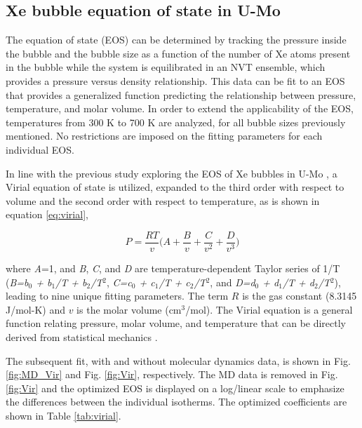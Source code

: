 \documentclass[review]{elsarticle}
\begin{document}
\subsection{Xe bubble equation of state in U-Mo}

The equation of state (EOS) can be determined by tracking the pressure inside the bubble and the bubble size as a function of the number of Xe atoms present in the bubble while the system is equilibrated in an NVT ensemble, which provides a pressure versus density relationship. This data can be fit to an EOS that provides a generalized function predicting the relationship between pressure, temperature, and molar volume. In order to extend the applicability of the EOS, temperatures from 300 K to 700 K are analyzed, for all bubble sizes previously mentioned. No restrictions are imposed on the fitting parameters for each individual EOS. 

In line with the previous study exploring the EOS of Xe bubbles in U-Mo \cite{Beeler2020}, a Virial equation of state is utilized, expanded to the third order with respect to volume and the second order with respect to temperature, as is shown in equation \ref{eq:virial}, 

\begin{equation}
\label{eq:virial}
P=\frac{RT}{v}\bigg( A + \frac{B}{v} + \frac{C}{v^2} + \frac{D}{v^3} \bigg)
\end{equation}

\noindent where \textit{A}=1, and \textit{B}, \textit{C}, and \textit{D} are temperature-dependent Taylor series of 1/T (\textit{B=b$_0$ + b$_1$/T + b$_2$/T$^2$}, \textit{C=c$_0$ + c$_1$/T + c$_2$/T$^2$}, and \textit{D=d$_0$ + d$_1$/T + d$_2$/T$^2$}), leading to nine unique fitting parameters. The term $R$ is the gas constant (8.3145 J/mol-K) and $v$ is the molar volume (cm$^3$/mol). The Virial equation is a general function relating pressure, molar volume, and temperature that can be directly derived from statistical mechanics \cite{virial}. 

The subsequent fit, with and without molecular dynamics data, is shown in Fig. \ref{fig:MD_Vir} and Fig. \ref{fig:Vir}, respectively. The MD data is removed in Fig. \ref{fig:Vir} and the optimized EOS is displayed on a log/linear scale to emphasize the differences between the individual isotherms. The optimized coefficients are shown in Table \ref{tab:virial}. 
\end{document}
